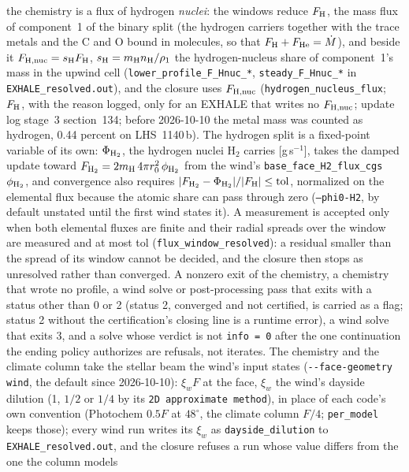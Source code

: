 the chemistry is a flux of hydrogen \emph{nuclei}: the windows reduce
$F_{\rm H}$, the mass flux of component~1 of the binary split (the hydrogen
carriers together with the trace metals and the C and O bound in molecules,
so that $F_{\rm H}+F_{\rm He}=\dot M$), and beside it
$F_{\rm H,nuc}=s_{\rm H}F_{\rm H}$, $s_{\rm H}=m_{\rm H}n_{\rm H}/\rho_1$ the
hydrogen-nucleus share of component~1's mass in the upwind cell
(\texttt{lower\_profile\_F\_Hnuc\_*}, \texttt{steady\_F\_Hnuc\_*} in
\texttt{EXHALE\_resolved.out}), and the closure uses $F_{\rm H,nuc}$
(\texttt{hydrogen\_nucleus\_flux}; $F_{\rm H}$, with the reason logged, only
for an EXHALE that writes no $F_{\rm H,nuc}$; update log stage~3 section~134; before 2026-10-10 the metal mass was
counted as hydrogen, 0.44 percent on LHS~1140\,b). The hydrogen split is a
fixed-point variable of its own: $\Phi_{\rm H_2}$, the hydrogen nuclei H$_2$
carries [g\,s$^{-1}$], takes the damped update toward
$F_{\rm H_2} = 2m_{\rm H}\,4\pi r_0^2\,\phi_{\rm H_2}$ from the wind's
\texttt{base\_face\_H2\_flux\_cgs} $\phi_{\rm H_2}$, and convergence also
requires $|F_{\rm H_2}-\Phi_{\rm H_2}|/|F_{\rm H}|\le{\rm tol}$, normalized
on the elemental flux because the atomic share can pass through zero
(\texttt{--phi0-H2}, by default unstated until the first wind states it). A measurement is
accepted only when both elemental fluxes are finite and their radial spreads
over the window are measured and at most tol
(\texttt{flux\_window\_resolved}): a residual smaller than the spread of its
window cannot be decided, and the closure then stops as unresolved rather
than converged. A nonzero exit of the chemistry, a chemistry that wrote no
profile, a wind solve or post-processing pass that exits with a status other
than 0 or 2 (status 2, converged and not certified, is carried as a flag;
status 2 without the certification's closing line is a runtime error), a
wind solve that exits 3, and a solve whose verdict is not \texttt{info = 0}
after the one continuation the ending policy authorizes are refusals, not
iterates. The chemistry and the climate column take the stellar beam the
wind's input states (\texttt{-{}-face-geometry wind}, the default since
2026-10-10): $\xi_wF$ at the face, $\xi_w$ the wind's dayside dilution
(1, $1/2$ or $1/4$ by its \texttt{2D approximate method}), in place of each
code's own convention (Photochem $0.5F$ at $48^\circ$, the climate column
$F/4$; \texttt{per\_model} keeps those); every wind run writes its
$\xi_w$ as \texttt{dayside\_dilution} to \texttt{EXHALE\_resolved.out}, and
the closure refuses a run whose value differs from the one the column models
